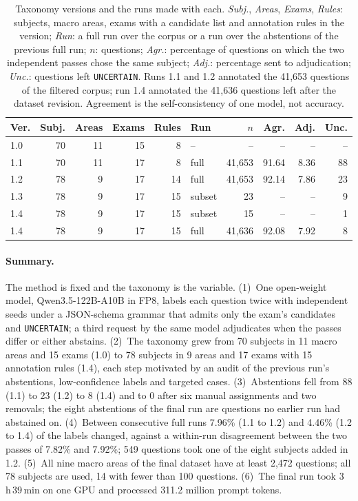 \begin{table}[t]
\centering
\footnotesize
\setlength{\tabcolsep}{3.5pt}
\begin{tabular}{@{}lrrrrlrrrr@{}}
\toprule
Ver. & Subj. & Areas & Exams & Rules & Run & $n$ & Agr. & Adj. & Unc. \\
\midrule
1.0 & 70 & 11 & 15 & 8 & -- & -- & -- & -- & -- \\
1.1 & 70 & 11 & 17 & 8 & full & 41,653 & 91.64 & 8.36 & 88 \\
1.2 & 78 & 9 & 17 & 14 & full & 41,653 & 92.14 & 7.86 & 23 \\
1.3 & 78 & 9 & 17 & 15 & subset & 23 & -- & -- & 9 \\
1.4 & 78 & 9 & 17 & 15 & subset & 15 & -- & -- & 1 \\
1.4 & 78 & 9 & 17 & 15 & full & 41,636 & 92.08 & 7.92 & 8 \\
\bottomrule
\end{tabular}
\caption{Taxonomy versions and the runs made with each. \emph{Subj.}, \emph{Areas}, \emph{Exams}, \emph{Rules}: subjects, macro areas, exams with a candidate list and annotation rules in the version; \emph{Run}: a full run over the corpus or a run over the abstentions of the previous full run; $n$: questions; \emph{Agr.}: percentage of questions on which the two independent passes chose the same subject; \emph{Adj.}: percentage sent to adjudication; \emph{Unc.}: questions left \texttt{UNCERTAIN}. Runs 1.1 and 1.2 annotated the 41,653 questions of the filtered corpus; run 1.4 annotated the 41,636 questions left after the dataset revision. Agreement is the self-consistency of one model, not accuracy.}
\label{tab:ka-overview}
\end{table}

\paragraph{Summary.} The method is fixed and the taxonomy is the variable.
(1)~One open-weight model, Qwen3.5-122B-A10B in FP8, labels each question
twice with independent seeds under a JSON-schema grammar that admits only the
exam's candidates and \texttt{UNCERTAIN}; a third request by the same model
adjudicates when the passes differ or either abstains. (2)~The taxonomy grew
from 70 subjects in 11 macro areas and 15 exams (1.0) to 78 subjects in 9
areas and 17 exams with 15 annotation rules (1.4), each step motivated by an
audit of the previous run's abstentions, low-confidence labels and targeted
cases. (3)~Abstentions fell from 88 (1.1) to 23 (1.2) to 8 (1.4) and to 0
after six manual assignments and two removals; the eight abstentions of the
final run are questions no earlier run had abstained on. (4)~Between
consecutive full runs 7.96\% (1.1 to 1.2) and 4.46\% (1.2 to 1.4) of the
labels changed, against a within-run disagreement between the two passes of
7.82\% and 7.92\%; 549 questions took one of the eight subjects added in 1.2.
(5)~All nine macro areas of the final dataset have at least 2,472 questions;
all 78 subjects are used, 14 with fewer than 100 questions. (6)~The final run
took 3\,h\,39\,min on one GPU and processed 311.2 million prompt tokens.


